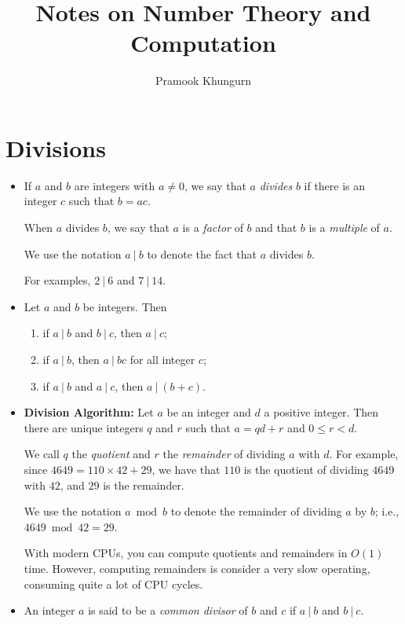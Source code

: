 \documentclass{article}
\title{Notes on Number Theory and Computation}
\author{Pramook Khungurn}
\newcommand{\divides}{\ |\ }
\begin{document}
\maketitle

\section{Divisions}
\begin{itemize}
\item If $a$ and $b$ are integers with $a \neq 0$, we say that $a$ \emph{divides} $b$ if there is an integer $c$ such that $b = ac$.

When $a$ divides $b$, we say that $a$ is a \emph{factor} of $b$ and that $b$ is a \emph{multiple} of $a$. 

We use the notation $a \divides b$ to denote the fact that $a$ divides $b$.

For examples, $2 \divides 6$ and $7 \divides 14$.

\item Let $a$ and $b$ be integers. Then
\begin{enumerate}
\item if $a \divides b$ and $b \divides c$, then $a \divides c$;
\item if $a \divides b$, then $a \divides bc$ for all integer $c$;
\item if $a \divides b$ and $a \divides c$, then $a \divides (b+c)$.
\end{enumerate}

\item {\bf Division Algorithm:} Let $a$ be an integer and $d$ a positive integer. Then there are unique integers $q$ and $r$ such that $a = qd + r$ and $0 \leq r < d$.

We call $q$ the \emph{quotient} and $r$ the \emph{remainder} of dividing $a$ with $d$. For example, since $4649 = 110 \times 42 + 29$, we have that $110$ is the quotient of dividing $4649$ with $42$, and $29$ is the remainder.

We use the notation $a \bmod b$ to denote the remainder of dividing $a$ by $b$; i.e., $4649 \bmod 42 = 29$.

With modern CPUs, you can compute quotients and remainders in $O(1)$ time. However, computing remainders is consider a very slow operating, consuming quite a lot of CPU cycles.

\item An integer $a$ is said to be a \emph{common divisor} of $b$ and $c$ if $a \divides b$ and $b \divides c$.


\end{itemize}
\end{document}

